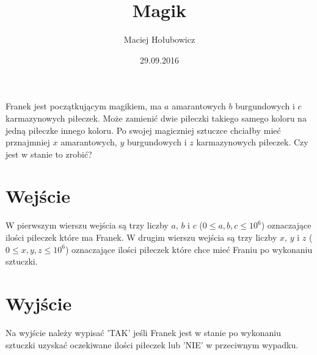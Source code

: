 \documentclass[zad,zawodnik,utf8]{sinol}
\title{Magik}
\author{Maciej Hołubowicz} %
\date{29.09.2016}
\begin{document}
  \begin{tasktext}%
  Franek jest początkującym magikiem, ma $a$ amarantowych $b$ burgundowych i $c$ karmazynowych piłeczek. Może zamienić dwie piłeczki takiego samego koloru na jedną piłeczke innego koloru. Po swojej magiczniej sztuczce chciałby mieć prznajmniej $x$ amarantowych, $y$ burgundowych i $z$ karmazynowych piłeczek. Czy jest w stanie to zrobić?  
  
 \section{Wejście}
    
  W pierwszym wierszu wejścia są trzy liczby $a$, $b$ i $c$ ($0 \leq a, b, c \leq 10^6$) oznaczające ilości piłeczek które ma Franek.
  W drugim wierszu wejścia są trzy liczby $x$, $y$ i $z$ ($0 \leq x, y, z \leq 10^6$) oznaczające ilości piłeczek które chce mieć Franiu po wykonaniu sztuczki.

  \section{Wyjście}
    Na wyjście należy wypisać 'TAK' jeśli Franek jest w stanie po wykonaniu sztuczki uzyskać oczekiwane ilości piłeczek lub 'NIE' w przeciwnym wypadku.
    
     \makecompactexample

  \end{tasktext}
\end{document}
